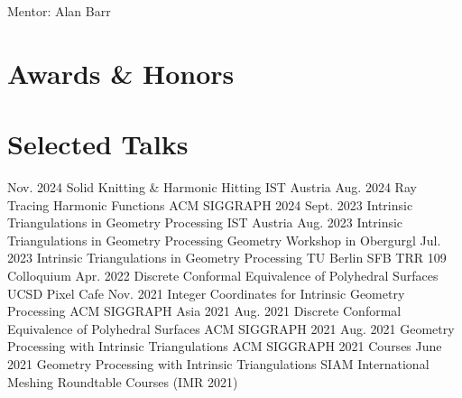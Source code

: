 \documentclass[11pt,letterpaper,roman,colorlinks=true]{moderncv}
\begin{document}
{Mentor: Alan Barr}
{}%





\section{Awards \& Honors}

\section{Selected Talks}
\cventry
    {Nov. 2024}
    {Solid Knitting \& Harmonic Hitting}
    {IST Austria}{}{}
    {}
\cventry
    {Aug. 2024}
    {Ray Tracing Harmonic Functions}
    {ACM SIGGRAPH 2024}{}{}
    {}
\cventry
    {Sept. 2023}
    {Intrinsic Triangulations in Geometry Processing}
    {IST Austria}{}{}
    {}
\cventry
    {Aug. 2023}
    {Intrinsic Triangulations in Geometry Processing}
    {Geometry Workshop in Obergurgl}{}{}
    {}
\cventry
    {Jul. 2023}
    {Intrinsic Triangulations in Geometry Processing}
    {TU Berlin SFB TRR 109 Colloquium}{}{}
    {}
\cventry
    {Apr. 2022}
    {Discrete Conformal Equivalence of Polyhedral Surfaces}
    {UCSD Pixel Cafe}{}{}
    {}
\cventry
    {Nov. 2021}
    {Integer Coordinates for Intrinsic Geometry Processing}
    {ACM SIGGRAPH Asia 2021}{}{}
    {}
\cventry
    {Aug. 2021}
    {Discrete Conformal Equivalence of Polyhedral Surfaces}
    {ACM SIGGRAPH 2021}{}{}
    {}
\cventry
    {Aug. 2021}
    {Geometry Processing with Intrinsic Triangulations}
    {ACM SIGGRAPH 2021 Courses}{}{}
    {}
\cventry
    {June 2021}
    {Geometry Processing with Intrinsic Triangulations}
    {SIAM International Meshing Roundtable Courses (IMR 2021)}{}{}
    {}
\end{document}
